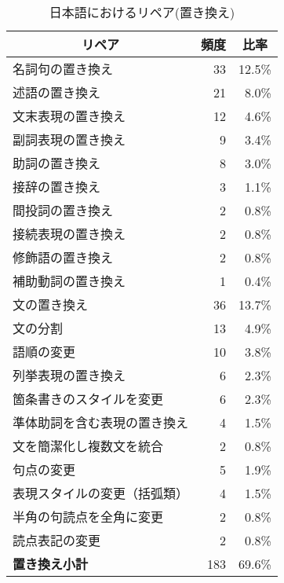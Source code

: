 \begin{table}[htbp]
    \leavevmode
\small
    \caption{日本語におけるリペア(置き換え)}
    \label{Table:Repairs_in_Japanese1}
    \vspace*{-3mm}
\begin {center}
\begin{tabular}{|l|r|r|}
\hline
\multicolumn{1}{|c|}{\bf リペア} & 
\multicolumn{1}{c|}{\bf 頻度} & 
\multicolumn{1}{c|}{\bf 比率} \\
\hline 
名詞句の置き換え             & 33 & 12.5\% \\ 
述語の置き換え               & 21 &  8.0\% \\ 
文末表現の置き換え           & 12 &  4.6\% \\ 
副詞表現の置き換え           &  9 &  3.4\% \\ 
助詞の置き換え               &  8 &  3.0\% \\ 
接辞の置き換え               &  3 &  1.1\% \\
\hline
間投詞の置き換え             &  2 &  0.8\% \\ 
接続表現の置き換え           &  2 &  0.8\% \\ 
\hline
修飾語の置き換え             &  2 &  0.8\% \\ 
補助動詞の置き換え           &  1 &  0.4\% \\ 
\hline
文の置き換え                 & 36 & 13.7\% \\
文の分割                     & 13 &  4.9\% \\
語順の変更                   & 10 &  3.8\% \\
列挙表現の置き換え           &  6 &  2.3\% \\
箇条書きのスタイルを変更     &  6 &  2.3\% \\
\hline
準体助詞を含む表現の置き換え &  4 &  1.5\% \\
文を簡潔化し複数文を統合     &  2 &  0.8\% \\
\hline 
句点の変更                   &  5 &  1.9\% \\  
表現スタイルの変更（括弧類） &  4 &  1.5\% \\ 
半角の句読点を全角に変更     &  2 &  0.8\% \\ 
読点表記の変更               &  2 &  0.8\% \\ 
\hline
{\bf 置き換え小計}           & 183 &  69.6\% \\ 
\hline
\end{tabular}
\end{center}
    \vspace*{-3mm}
\end{table}

